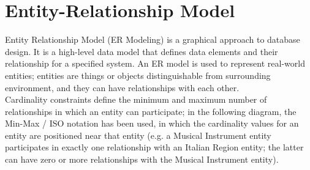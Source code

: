 \documentclass[../../DD.tex]{subfiles}
\begin{document}
\section{Entity-Relationship Model}

	Entity Relationship Model (ER Modeling) is a graphical approach to database design. It is a high-level data model that defines data elements and their relationship for a specified system. An ER model is used to represent real-world entities; entities are things or objects distinguishable from surrounding environment, and they can have relationships with each other.\\
	Cardinality constraints define the minimum and maximum number of relationships in which an entity can participate; in the following diagram, the Min-Max / ISO notation has been used, in which the cardinality values for an entity are positioned near that entity (e.g. a Musical Instrument entity participates in exactly one relationship with an Italian Region entity; the latter can have zero or more relationships with the Musical Instrument entity).
	
\end{document}
